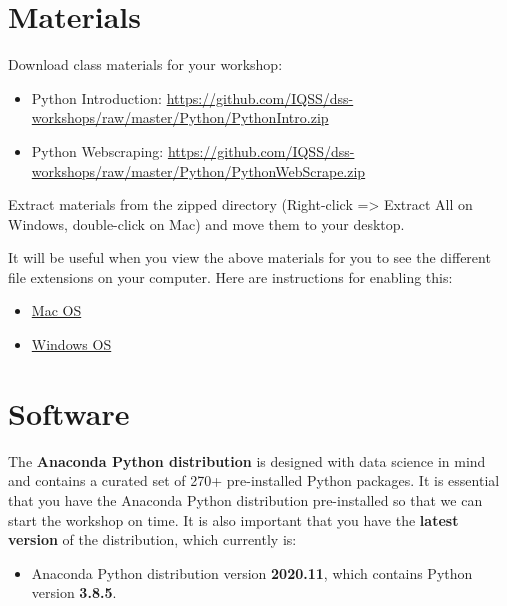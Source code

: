 \documentclass[
]{book}
\providecommand{\tightlist}{%
  \setlength{\itemsep}{0pt}\setlength{\parskip}{0pt}}
\begin{document}
\hypertarget{materials-1}{%
\section{Materials}\label{materials-1}}

Download class materials for your workshop:

\begin{itemize}
\tightlist
\item
  Python Introduction: \url{https://github.com/IQSS/dss-workshops/raw/master/Python/PythonIntro.zip}
\item
  Python Webscraping: \url{https://github.com/IQSS/dss-workshops/raw/master/Python/PythonWebScrape.zip}
\end{itemize}

Extract materials from the zipped directory (Right-click =\textgreater{} Extract All on Windows, double-click on Mac) and move them to your desktop.

It will be useful when you view the above materials for you to see the different file extensions on your computer. Here are instructions for enabling this:

\begin{itemize}
\tightlist
\item
  \href{https://support.apple.com/guide/mac-help/show-or-hide-filename-extensions-on-mac-mchlp2304/mac}{Mac OS}
\item
  \href{http://kb.winzip.com/kb/entry/26/}{Windows OS}
\end{itemize}

\hypertarget{software-1}{%
\section{Software}\label{software-1}}

The \textbf{Anaconda Python distribution} is designed with data science in mind and contains a curated set of 270+ pre-installed Python packages. It is essential that you have the Anaconda Python distribution pre-installed so that we can start the workshop on time. It is also important that you have the \textbf{latest version} of the distribution, which currently is:

\begin{itemize}
\tightlist
\item
  Anaconda Python distribution version \textbf{2020.11}, which contains Python version \textbf{3.8.5}.
\end{itemize}
\end{document}
